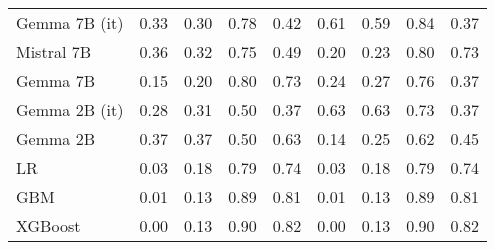 \begin{tabular}{lllllllll}
Gemma 7B (it) & 0.33 & 0.30 & 0.78 & 0.42 & \cellcolor{orange!14.7} 0.61 & \cellcolor{orange!4.7} 0.59 & \cellcolor{cyan!3.8} 0.84 & \cellcolor{orange!25.0} 0.37 \\
Mistral 7B & \cellcolor{orange!15.7} 0.36 & 0.32 & 0.75 & 0.49 & 0.20 & 0.23 & 0.80 & 0.73 \\
Gemma 7B & 0.15 & 0.20 & 0.80 & 0.73 & 0.24 & 0.27 & 0.76 & \cellcolor{orange!25.0} 0.37 \\
Gemma 2B (it) & 0.28 & 0.31 & \cellcolor{orange!25.0} 0.50 & \cellcolor{orange!25.0} 0.37 & \cellcolor{orange!25.0} 0.63 & \cellcolor{orange!25.0} 0.63 & 0.73 & \cellcolor{orange!25.0} 0.37 \\
Gemma 2B & \cellcolor{orange!25.0} 0.37 & \cellcolor{orange!25.0} 0.37 & \cellcolor{orange!25.0} 0.50 & 0.63 & \cellcolor{cyan!25.0} 0.14 & 0.25 & \cellcolor{orange!25.0} 0.62 & 0.45 \\
LR & 0.03 & 0.18 & 0.79 & 0.74 & 0.03 & 0.18 & 0.79 & 0.74 \\
GBM & 0.01 & 0.13 & 0.89 & 0.81 & 0.01 & 0.13 & 0.89 & 0.81 \\
XGBoost & 0.00 & 0.13 & 0.90 & 0.82 & 0.00 & 0.13 & 0.90 & 0.82 \\
\bottomrule
\end{tabular}

